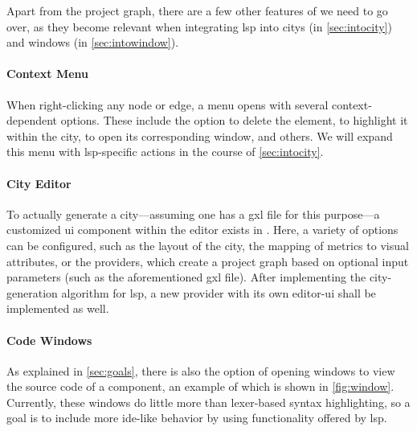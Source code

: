 \documentclass[../thesis]{subfiles}
\begin{document}
Apart from the project graph, there are a few other features of \SEE{} we need to go over, as they become relevant when integrating \gls{lsp} into \glspl{city} (in \cref{sec:intocity}) and \glspl{window} (in \cref{sec:intowindow}).

\paragraph{Context Menu}
When right-clicking any node or edge, a menu opens with several context-dependent options.
These include the option to delete the element, to highlight it within the \gls{city}, to open its corresponding \gls{window}, and others.
We will expand this menu with \gls{lsp}-specific actions in the course of \cref{sec:intocity}.

\paragraph{City Editor}
To actually generate a \gls{city}---assuming one has a \gls{gxl} file for this purpose---a customized \gls{ui} component within the \gls{editor} exists in \SEE{}. 
Here, a variety of options can be configured, such as the layout of the city, the mapping of metrics to visual attributes, or the \glspl*{provider}, which create a project graph based on optional input parameters (such as the aforementioned \gls{gxl} file).
After implementing the city-generation algorithm for \gls{lsp}, a new \gls{provider} with its own \gls{editor}-\gls{ui} shall be implemented as well.

\paragraph{Code Windows}
As explained in \cref{sec:goals}, there is also the option of opening \glspl{window} to view the source code of a component, an example of which is shown in \cref{fig:window}.
Currently, these windows do little more than lexer-based syntax highlighting, so a goal is to include more \gls{ide}-like behavior by using functionality offered by \gls{lsp}.
\end{document}
